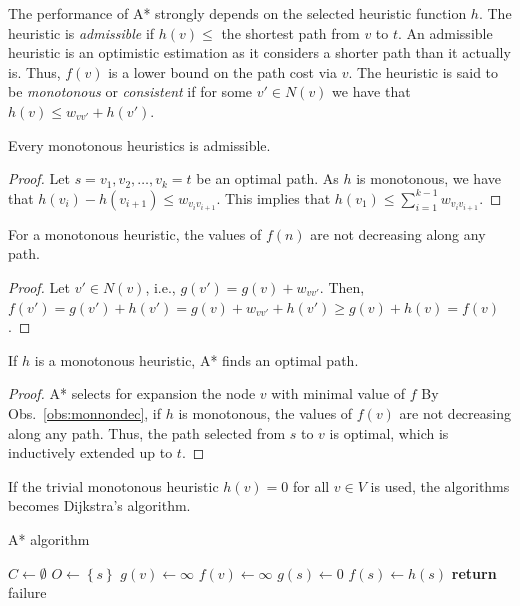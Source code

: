 The performance of A* strongly depends on the selected heuristic function $h$.
The heuristic is \emph{admissible} if $h(v)\leq$ the shortest path from $v$ to $t$.
An admissible heuristic is an optimistic estimation as it considers a shorter path than it actually is. 
Thus, $f(v)$ is a lower bound on the path cost via $v$.
The heuristic is said to be \emph{monotonous} or \emph{consistent} if for some $v'\in N(v)$ we have that $h(v)\leq w_{vv'}+h(v')$.
\begin{observation}
Every monotonous heuristics is admissible.
\end{observation}
\begin{proof}
Let $s=v_1,v_2,\dots,v_k=t$ be an optimal path.
As $h$ is monotonous, we have that $h(v_i)-h(v_{i+1})\leq w_{v_iv_{i+1}}$.
	This implies that $h(v_1)\leq\sum_{i=1}^{k-1}w_{v_iv_{i+1}}$.
\end{proof}
\begin{observation}
For a monotonous heuristic, the values of $f(n)$ are not decreasing along any path.
\end{observation}
\begin{proof}\label{obs:monnondec}
	Let $v'\in N(v)$, i.e., $g(v')=g(v)+w_{vv'}$.
Then, $f(v')=g(v')+h(v')=g(v)+w_{vv'}+h(v')\geq g(v)+h(v)=f(v)$.
\end{proof}
\begin{proposition}
If $h$ is a monotonous heuristic, A* finds an optimal path.
\end{proposition}
\begin{proof}
	A* selects for expansion the node $v$ with minimal value of $f$ 
	By Obs.~\ref{obs:monnondec}, if $h$ is monotonous, the values of $f(v)$ are not decreasing along any path.
	Thus, the path selected from $s$ to $v$ is optimal, which is inductively extended up to $t$.
\end{proof}
If the trivial monotonous heuristic $h(v)=0$ for all $v\in V$ is used, the algorithms becomes Dijkstra's algorithm.

\begin{algorithm}
\DontPrintSemicolon
\SetAlgoLined
\caption{A* algorithm}
\BlankLine
{}
\BlankLine
$C\leftarrow\emptyset$\;
$O\leftarrow\left\{s\right\}$\;
 {
	$g(v)\leftarrow\infty$\;
	$f(v)\leftarrow\infty$\;
}
$g(s)\leftarrow 0$\;
$f(s)\leftarrow h(s)$\;
\textbf{return } failure
\label{alg:astar}
\end{algorithm}

